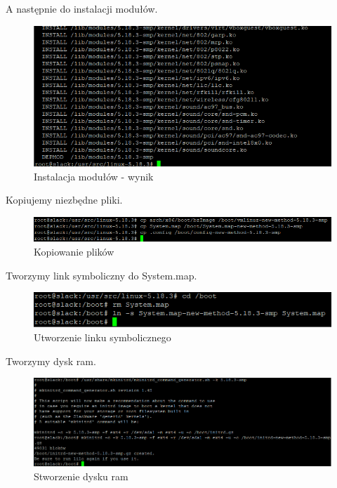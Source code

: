\documentclass[a4paper,12pt,oneside]{book} %
\begin{document}
A następnie do instalacji modułów.

\begin{figure}[h]
	\centering
	\includegraphics[scale=0.6]{34-install}
	\caption{Instalacja modułów - wynik}
\end{figure}

Kopiujemy niezbędne pliki.

\begin{figure}[h]
	\centering
	\includegraphics[scale=0.6]{35-copy}
	\caption{Kopiowanie plików}
\end{figure}

\pagebreak

Tworzymy link symboliczny do System.map.

\begin{figure}[h]
	\centering
	\includegraphics[scale=0.6]{36-sysmap}
	\caption{Utworzenie linku symbolicznego}
\end{figure}

Tworzymy dysk ram.

\begin{figure}[h]
	\centering
	\includegraphics[scale=0.6]{37-ram}
	\caption{Stworzenie dysku ram}
\end{figure}
\end{document}
